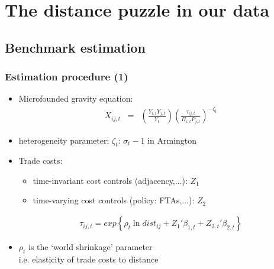 \documentclass{beamer}
\begin{document}
\section{The distance puzzle in our data}
\subsection{Benchmark estimation}
\begin{frame}\frametitle{Estimation procedure (1)}
\begin{itemize}
\item Microfounded gravity equation:
\begin{eqnarray}
X_{ij,t} & = & \left(\frac{Y_{i,t}Y_{j,t}}{Y_t}\right)\left(\frac{\tau_{ij,t}}{\Pi_{i,t}P_{j,t}}\right)^{-\zeta_t} \nonumber
\end{eqnarray}
\item heterogeneity parameter: $\zeta_t$: $\sigma_{t}-1$ in Armington 
\vspace{.3cm}
\item Trade costs: 
\begin{itemize}
\item time-invariant cost controls (adjacency,...): $Z_1$
\item time-varying cost controls (policy: FTAs,...): $Z_2$
\end{itemize}
\begin{gather}
\tau_{ij,t}=exp\left\{\rho_t\ln{dist_{ij}}+{Z_{1}}'\beta_{1,t}+{Z_{2,t}}'\beta_{2,t}\right\} \nonumber
\end{gather}
\item $\rho_t$ is the `world shrinkage' parameter \\ 
\hspace{1cm} i.e. elasticity of trade costs to distance
\end{itemize}
\end{frame}
\end{document}
